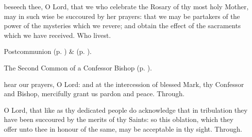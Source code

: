 \vspace{-0.25\baselineskip}

\postcommunion

\vspace{-0.15\baselineskip}

 beseech thee, O Lord, that we who celebrate the Rosary of thy most holy Mother, may in such wise be succoured by her prayers: that we may be partakers of the power of the mysteries which we revere; and obtain the effect of the sacraments which we have received. Who livest.

\begin{rubric}
	 Postcommunion  (p. \pageref{MarkRomePostcommunion}) \&   (p. \pageref{SergiusPostcommunion}).
\end{rubric}



\begin{rubric}
	The Second Common of a Confessor Bishop (p. \pageref{CommonConfessorBishopII}).
\end{rubric}

\vspace{-0.25\baselineskip}

\collect\label{MarkRomeCollect}

\vspace{-0.15\baselineskip}

 hear our prayers, O Lord: and at the intercession of blessed Mark, thy Confessor and Bishop, mercifully grant us pardon and peace. Through.

\vspace{-0.25\baselineskip}

\secret\label{MarkRomeSecret}

\vspace{-0.15\baselineskip}

 O Lord, that like as thy dedicated people do acknowledge that in tribulation they have been succoured by the merits of thy Saints: so this oblation, which they offer unto thee in honour of the same, may be acceptable in thy sight. Through.

\vspace{-0.25\baselineskip}

